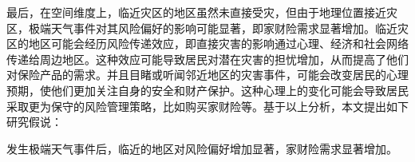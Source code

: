 最后，在空间维度上，临近灾区的地区虽然未直接受灾，但由于地理位置接近灾区，极端天气事件对其风险偏好的影响可能显著\citep{0Do}，即家财险需求显著增加。临近灾区的地区可能会经历风险传递效应，即直接灾害的影响通过心理、经济和社会网络传递给周边地区。这种效应可能导致居民对潜在灾害的担忧增加，从而提高了他们对保险产品的需求。并且目睹或听闻邻近地区的灾害事件，可能会改变居民的心理预期，使他们更加关注自身的安全和财产保护。这种心理上的变化可能会导致居民采取更为保守的风险管理策略，比如购买家财险等。基于以上分析，本文提出如下研究假说：

\begin{hyp} \label{hyp:3}
    发生极端天气事件后，临近的地区对风险偏好增加显著，家财险需求显著增加。
\end{hyp}
